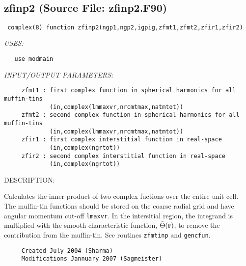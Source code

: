 \documentclass[11pt]{article}
\begin{document}



 
 
\mbox{}\hrulefill\ 
 
\subsection{zfinp2 (Source File: zfinp2.F90)}


\begin{verbatim} complex(8) function zfinp2(ngp1,ngp2,igpig,zfmt1,zfmt2,zfir1,zfir2)\end{verbatim}{\em USES:}
\begin{verbatim}   use modmain\end{verbatim}{\em INPUT/OUTPUT PARAMETERS:}
\begin{verbatim}     zfmt1 : first complex function in spherical harmonics for all muffin-tins
             (in,complex(lmmaxvr,nrcmtmax,natmtot))
     zfmt2 : second complex function in spherical harmonics for all muffin-tins
             (in,complex(lmmaxvr,nrcmtmax,natmtot))
     zfir1 : first complex interstitial function in real-space
             (in,complex(ngrtot))
     zfir2 : second complex interstitial function in real-space
             (in,complex(ngrtot))\end{verbatim}
{\sf DESCRIPTION:\\ }


     Calculates the inner product of two complex fuctions over the entire unit
     cell. The muffin-tin functions should be stored on the coarse radial grid
     and have angular momentum cut-off {\tt lmaxvr}. In the intersitial region,
     the integrand is multiplied with the smooth characteristic function,
     $\tilde{\Theta}({\bf r})$, to remove the contribution from the muffin-tin.
     See routines {\tt zfmtinp} and {\tt gencfun}.
  
\begin{verbatim}     Created July 2004 (Sharma)
     Modifications Jannuary 2007 (Sagmeister)\end{verbatim}


 
 
\end{document}
